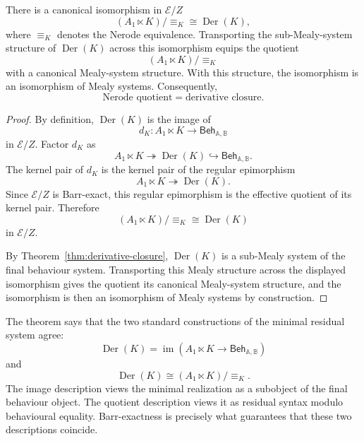 \begin{theorem}
\label{thm:general-nerode-realization}
There is a canonical isomorphism in \(\mathcal E/Z\)
\[
(A_1\ltimes K)/{\equiv_K}
\cong
\operatorname{Der}(K),
\]
where \(\equiv_K\) denotes the Nerode equivalence. Transporting the
sub-Mealy-system structure of \(\operatorname{Der}(K)\) across this
isomorphism equips the quotient
\[
(A_1\ltimes K)/{\equiv_K}
\]
with a canonical Mealy-system structure. With this structure, the isomorphism
is an isomorphism of Mealy systems. Consequently,
\[
\text{Nerode quotient}
=
\text{derivative closure}.
\]
\end{theorem}

\begin{proof}
By definition, \(\operatorname{Der}(K)\) is the image of
\[
d_K:
A_1\ltimes K
\to
\mathsf{Beh}_{\mathbb A,\mathbb B}
\]
in \(\mathcal E/Z\). Factor \(d_K\) as
\[
A_1\ltimes K
\twoheadrightarrow
\operatorname{Der}(K)
\hookrightarrow
\mathsf{Beh}_{\mathbb A,\mathbb B}.
\]
The kernel pair of \(d_K\) is the kernel pair of the regular epimorphism
\[
A_1\ltimes K
\twoheadrightarrow
\operatorname{Der}(K).
\]
Since \(\mathcal E/Z\) is Barr-exact, this regular epimorphism is the
effective quotient of its kernel pair. Therefore
\[
(A_1\ltimes K)/{\equiv_K}
\cong
\operatorname{Der}(K)
\]
in \(\mathcal E/Z\).

By Theorem~\ref{thm:derivative-closure}, \(\operatorname{Der}(K)\) is a
sub-Mealy system of the final behaviour system. Transporting this Mealy
structure across the displayed isomorphism gives the quotient its canonical
Mealy-system structure, and the isomorphism is then an isomorphism of Mealy
systems by construction.
\end{proof}

\begin{remark}
\label{rem:quotient-form-residual-realization}
The theorem says that the two standard constructions of the minimal residual
system agree:
\[
\operatorname{Der}(K)
=
\operatorname{im}
\left(
A_1\ltimes K\to\mathsf{Beh}_{\mathbb A,\mathbb B}
\right)
\]
and
\[
\operatorname{Der}(K)
\cong
(A_1\ltimes K)/{\equiv_K}.
\]
The image description views the minimal realization as a subobject of the
final behaviour object. The quotient description views it as residual syntax
modulo behavioural equality. Barr-exactness is precisely what guarantees that
these two descriptions coincide.
\end{remark}

